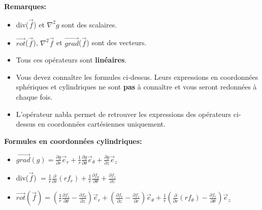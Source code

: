 \documentclass{article}
\begin{document}
\textbf{Remarques:} \\[0.2cm]

\begin{itemize}
  \item div($\vec{f}$) et $\nabla^2 g$ sont des scalaires. 
  \item $\vec{rot}$($\vec{f}$), $\nabla^2 \vec{f}$ et $\vec{grad}$($\vec{f}$)  sont des vecteurs. 
  \item Tous ces opérateurs sont \textbf{linéaires}.
  \item Vous devez connaître les formules ci-dessus. Leurs expressions en coordonnées sphériques et cylindriques ne sont \textbf{pas} à connaître et vous seront redonnées à chaque fois.
  \item L'opérateur nabla permet de retrouver les expressions des opérateurs ci-dessus en coordonnées cartésiennes uniquement.  \\[0.2cm]
\end{itemize}

\textbf{Formules en coordonnées cylindriques:} \\[0.2cm]  

\begin{itemize}
  \item $\vec{grad} (g) = \frac{\partial g}{\partial r} \vec{e}_r + \frac{1}{r} \frac{\partial g}{\partial \theta} \vec{e}_\theta + \frac{\partial g}{\partial z} \vec{e}_z$
  \item div($\vec{f}$) $= \frac{1}{r} \frac{\partial}{\partial r}(r f_r) + \frac{1}{r} \frac{\partial f_\theta}{\partial \theta} + \frac{\partial f_z}{\partial z}$
  \item $\vec{rot}(\vec{f}) = \left( \frac{1}{r} \frac{\partial f_z}{\partial \theta} - \frac{\partial f_\theta}{\partial z} \right) \vec{e}_r 
  + \left( \frac{\partial f_r}{\partial z} - \frac{\partial f_z}{\partial r} \right) \vec{e}_\theta 
  + \frac{1}{r} \left( \frac{\partial}{\partial r}(r f_\theta) - \frac{\partial f_r}{\partial \theta} \right) \vec{e}_z $ \\[1cm]
\end{itemize}
\end{document}
